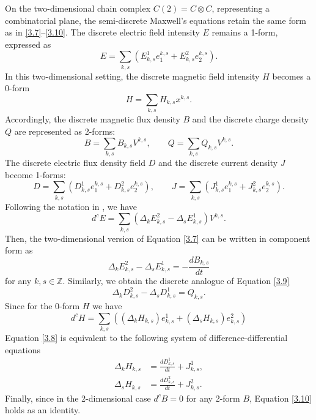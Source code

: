 \documentclass[english]{article}
\theoremstyle{plain}
\theoremstyle{definition}
\theoremstyle{remark}
\numberwithin{equation}{section}
\begin{document}
  On the two-dimensional chain complex $C(2)=C\otimes C$, representing a combinatorial plane, the semi-discrete Maxwell’s equations retain the same form as in \eqref{3.7}–\eqref{3.10}. The discrete electric field intensity
$E$ remains a 1-form, expressed as
  \begin{equation*}\label{}
    E=\sum_{k,s}\left(E^1_{k,s}e_1^{k,s}+E^2_{k,s}e_2^{k,s}\right).
\end{equation*}
In this two-dimensional setting, the discrete magnetic field intensity
$H$ becomes a 0-form
\begin{equation*}\label{}
    H=\sum_{k,s}H_{k,s}x^{k,s}.
\end{equation*}
Accordingly, the discrete magnetic flux density
$B$ and the discrete charge density
$Q$ are represented as 2-forms:
\begin{equation*}\label{}
    B=\sum_{k,s}B_{k,s}V^{k,s},  \qquad   Q=\sum_{k,s}Q_{k,s}V^{k,s}.
\end{equation*}
The discrete electric  flux density field $D$ and the discrete current density $J$ become 1-forms:
\begin{equation*}\label{}
    D=\sum_{k,s}\left(D^1_{k,s}e_1^{k,s}+D^2_{k,s}e_2^{k,s}\right), \qquad J=\sum_{k,s}\left(J^1_{k,s}e_1^{k,s}+J^2_{k,s}e_2^{k,s}\right).
\end{equation*}
Following the notation in \cite{S5}, we have
\begin{equation}\label{4.1}
    d^cE=\sum_{k,s}\left(\Delta_kE^2_{k,s}-\Delta_sE^1_{k,s}\right)V^{k,s}.
\end{equation}
Then, the two-dimensional version of Equation \eqref{3.7} can be written in component form as
\begin{equation}\label{4.2}
    \Delta_kE^2_{k,s}-\Delta_sE^1_{k,s}=-\frac{dB_{k,s}}{dt}
\end{equation}
for any $k,  s \in {\mathbb Z}$. Similarly, we obtain the discrete analogue of Equation \eqref{3.9}
\begin{equation}\label{4.3}
    \Delta_kD^2_{k,s}-\Delta_sD^1_{k,s}=Q_{k,s}.
\end{equation}
 Since for the 0-form $H$ we have
 \begin{equation}\label{4.4}
     d^cH=\sum_{k,s}\left((\Delta_kH_{k,s})e^1_{k,s}+(\Delta_sH_{k,s})e^2_{k,s}\right)
\end{equation}
Equation \eqref{3.8} is equivalent to the following system of difference-differential equations
\begin{align}\label{4.5}
\Delta_k H_{k,s}&= \frac{dD^{1}_{k,s}}{dt}  + J^{1}_{k,s}, \nonumber \\
\Delta_s H_{k,s}&= \frac{dD^{2}_{k,s}}{dt}  + J^{2}_{k,s}.
\end{align}
Finally, since in the 2-dimensional case  $d^c B=0$ for any 2-form $B$, Equation \eqref{3.10} holds as an identity.
\end{document}
